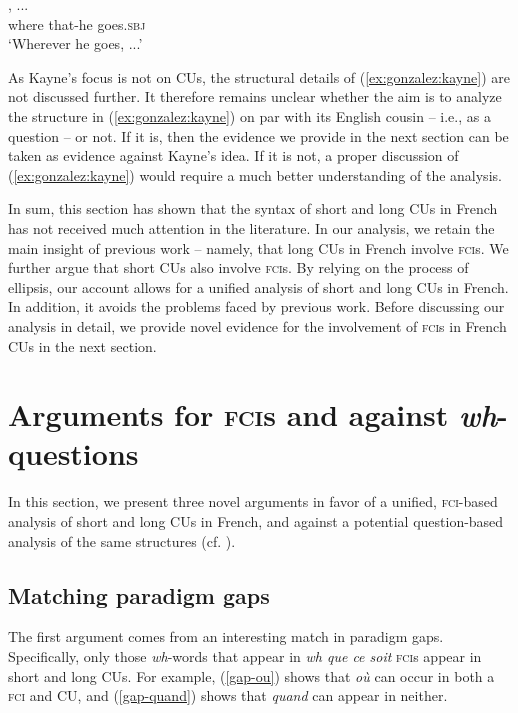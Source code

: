 \documentclass[output=paper]{langscibook}
\begin{document}
  

\ea \label{ex:gonzalez:kayne}
    , ... \\
    {} where {} that-he goes.\textsc{sbj}  \\
    \glt `Wherever he goes, ...' 
\z

As Kayne's focus is not on CUs, the structural details of (\ref{ex:gonzalez:kayne}) are not discussed further. It therefore remains unclear whether the aim is to analyze the structure in (\ref{ex:gonzalez:kayne}) on par with its English cousin -- i.e., as a question -- or not. If it is, then the evidence we provide in the next section can be taken as evidence against Kayne's idea. If it is not, a proper discussion of (\ref{ex:gonzalez:kayne}) would require a much better understanding of the analysis. 


In sum, this section has shown that the syntax of short and long CUs in French has not received much attention in the literature. In our analysis, we retain the main insight of previous work -- namely, that long CUs in French involve \textsc{fci}s. We further argue that short CUs also involve \textsc{fci}s. By relying on the process of ellipsis, our account allows for a unified analysis of short and long CUs in French. In addition, it avoids the problems faced by previous work. Before discussing our analysis in detail, we provide novel evidence for the involvement of \textsc{fci}s in French CUs in the next section.

  

\section{Arguments for \textsc{fci}s and against \emph{wh}-questions}\label{sec:gonzalez:3}

In this section, we present three novel arguments in favor of a unified, \textsc{fci}-based analysis of short and long CUs in French, and against a potential question-based analysis of the same structures (cf. \citealt{rawlins2013}).

\subsection{Matching paradigm gaps}

The first argument comes from an interesting match in paradigm gaps. Specifically, only those \emph{wh}-words that appear in \emph{wh que ce soit} \textsc{fci}s appear in short and long CUs. For example, (\ref{gap-ou}) shows that \emph{où} can occur in both a \textsc{fci} and  CU, and (\ref{gap-quand}) shows that \emph{quand} can appear in neither.
\end{document}
